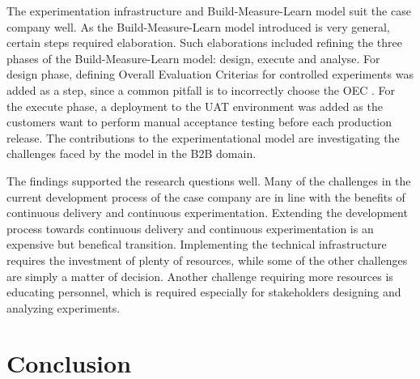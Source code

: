 \documentclass[english]{tktltiki2}
\theoremstyle{definition}
\theoremstyle{remark}
\begin{document}
The experimentation infrastructure and Build-Measure-Learn model \cite{fagerholm2014building} suit the case company well. As the Build-Measure-Learn model introduced is very general, certain steps required elaboration. Such elaborations included refining the three phases of the Build-Measure-Learn model: design, execute and analyse. For design phase, defining Overall Evaluation Criterias for controlled experiments was added as a step, since a common pitfall is to incorrectly choose the OEC \cite{crook2009seven}. For the execute phase, a deployment to the UAT environment was added as the customers want to perform manual acceptance testing before each production release. The contributions to the experimentational model are investigating the challenges faced by the model in the B2B domain. 

The findings supported the research questions well. Many of the challenges in the current development process of the case company are in line with the benefits of continuous delivery and continuous experimentation. Extending the development process towards continuous delivery and continuous experimentation is an expensive but benefical transition. Implementing the technical infrastructure requires the investment of plenty of resources, while some of the other challenges are simply a matter of decision. Another challenge requiring more resources is educating personnel, which is required especially for stakeholders designing and analyzing experiments.

\section{Conclusion}
\end{document}
